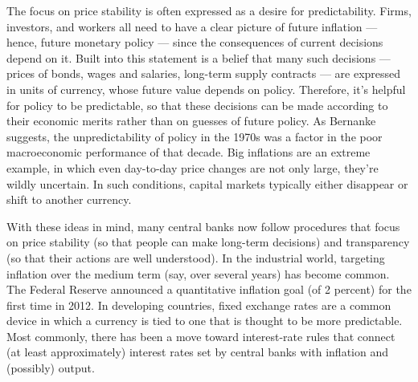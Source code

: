The focus on price stability is often expressed as
a desire for predictability.
Firms, investors, and workers all need to have a clear picture
of future inflation --- hence, future monetary policy --- since the consequences of current decisions depend on it.
Built into this statement is a belief that many such decisions ---
prices of bonds, wages and salaries, long-term supply contracts ---
are expressed in units of currency, whose future value depends on policy.
Therefore, it's helpful for policy to be predictable, so that these
decisions can be made according to their economic merits
rather than on guesses of future policy.
As Bernanke
 suggests, the unpredictability of policy in the 1970s was a factor in
the poor macroeconomic performance of that decade.
Big inflations are an extreme example,
in which even day-to-day price changes are not only large, they're wildly uncertain.
In such conditions, capital markets typically either disappear
or shift to another currency.

With these ideas in mind,
many central banks  now follow procedures that focus on price
stability (so that people can make long-term decisions)
and transparency
(so that their actions are well understood).
In the industrial world, targeting inflation over the medium term (say, over
several years) has become common. The Federal Reserve announced
a quantitative inflation goal 
 (of 2 percent) for the first time in 2012.
In developing countries, fixed exchange rates are a common device
in which a currency is tied to one that is thought to be more predictable.
Most commonly, there has been a move toward interest-rate rules
that connect (at least approximately)
interest rates set by central banks  with inflation and (possibly) output.


